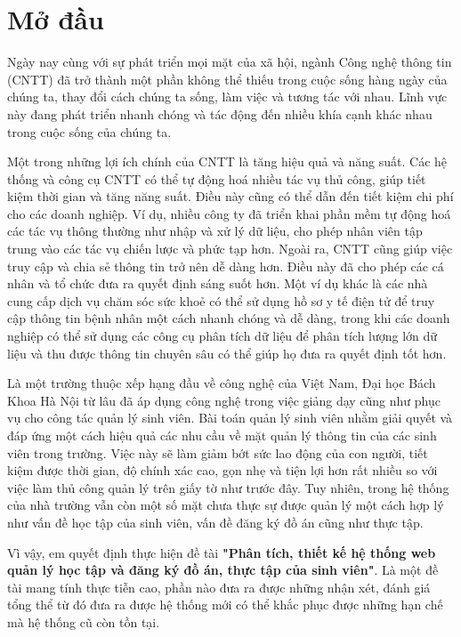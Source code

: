 \chapter*{Mở đầu}
Ngày nay cùng với sự phát triển mọi mặt của xã hội, ngành Công nghệ thông tin (CNTT) đã trở thành một phần không thể thiếu trong cuộc sống hàng ngày của chúng ta, thay đổi cách chúng ta sống, làm việc và tương tác với nhau.
Lĩnh vực này đang phát triển nhanh chóng và tác động đến nhiều khía cạnh khác nhau trong cuộc sống của chúng ta.

Một trong những lợi ích chính của CNTT là tăng hiệu quả và năng suất. Các hệ thống và công cụ CNTT có thể tự động hoá nhiều tác vụ thủ công, giúp tiết kiệm thời gian và tăng năng suất.
Điều này cũng có thể dẫn đến tiết kiệm chi phí cho các doanh nghiệp. Ví dụ, nhiều công ty đã triển khai phần mềm tự động hoá các tác vụ thông thường như nhập và xử lý dữ liệu, cho phép nhân viên tập trung vào các tác vụ chiến lược và phức tạp hơn.
Ngoài ra, CNTT cũng giúp việc truy cập và chia sẻ thông tin trở nên dễ dàng hơn. Điều này đã cho phép các cá nhân và tổ chức đưa ra quyết định sáng suốt hơn. 
Một ví dụ khác là các nhà cung cấp dịch vụ chăm sóc sức khoẻ có thể sử dụng hồ sơ y tế điện tử để truy cập thông tin bệnh nhân một cách nhanh chóng và dễ dàng, trong khi các doanh nghiệp có thể sử dụng các công cụ phân tích dữ liệu để phân tích lượng lớn dữ liệu và thu được thông tin chuyên sâu có thể giúp họ đưa ra quyết định tốt hơn.

Là một trường thuộc xếp hạng đầu về công nghệ của Việt Nam, Đại học Bách Khoa Hà Nội từ lâu đã áp dụng công nghệ trong việc giảng dạy cũng như phục vụ cho công tác quản lý sinh viên.
Bài toán quản lý sinh viên nhằm giải quyết và đáp ứng một cách hiệu quả các nhu cầu về mặt quản lý thông tin của các sinh viên trong trường.
Việc này sẽ làm giảm bớt sức lao động của con người, tiết kiệm được thời gian, độ chính xác cao, gọn nhẹ và tiện lợi hơn rất nhiều so với việc làm thủ công quản lý trên giấy tờ như trước đây.
Tuy nhiên, trong hệ thống của nhà trường vẫn còn một số mặt chưa thực sự được quản lý một cách hợp lý như vấn đề học tập của sinh viên, vấn đề đăng ký đồ án cũng như thực tập.

Vì vậy, em quyết định thực hiện đề tài \textbf{"Phân tích, thiết kế hệ thống web quản lý học tập và đăng ký đồ án, thực tập của sinh viên"}.
Là một đề tài mang tính thực tiễn cao, phần nào đưa ra được những nhận xét, đánh giá tổng thể từ đó đưa ra được hệ thống mới có thể khắc phục được những hạn chế mà hệ thống cũ còn tồn tại.


